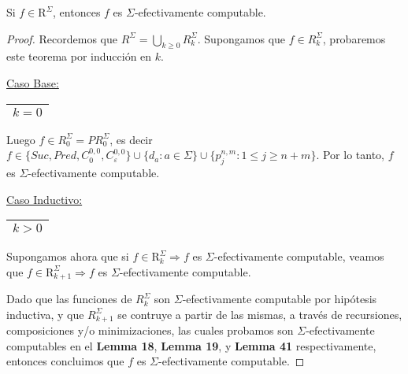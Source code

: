   \begin{theorem}
    \par Si $f \in \mathrm{R}^{\Sigma}$, entonces $f$ es $\Sigma$-efectivamente computable.
  \end{theorem}
  \begin{proof}
    \par Recordemos que $R^{\Sigma} = \bigcup\limits_{k \geq 0} R_{k}^{\Sigma}$. Supongamos que $f \in
    R_{k}^{\Sigma}$, probaremos este teorema por inducción en $k$.

    \vspace{3mm}
    \underline{Caso Base:} \begin{tabular}{|c|} \hline $k = 0$ \\\hline \end{tabular}

    \par Luego $f \in R_{0}^{\Sigma} = PR_{0}^{\Sigma}$, es decir $f \in \{Suc, Pred, C_{0}^{0,0},
    C_{\varepsilon}^{0,0}\} \cup \{d_{a}: a \in \Sigma\} \cup \{p_{j}^{n,m} : 1 \leq j \geq n+m\}$. Por lo tanto, $f$ es
    $\Sigma$-efectivamente computable.

    \vspace{3mm}
		\underline{Caso Inductivo:} \begin{tabular}{|c|} \hline $k > 0$ \\\hline \end{tabular}

    \par Supongamos ahora que si $f \in \mathrm{R}_{k}^{\Sigma} \Rightarrow f$ es $\Sigma$-efectivamente computable,
    veamos que $f \in \mathrm{R}_{k+1}^{\Sigma} \Rightarrow f$ es $\Sigma$-efectivamente computable.

    \par Dado que las funciones de $R_{k}^{\Sigma}$ son $\Sigma$-efectivamente computable por hipótesis inductiva, y que
    $R_{k+1}^{\Sigma}$ se contruye a partir de las mismas, a través de recursiones, composiciones y/o minimizaciones,
    las cuales probamos son $\Sigma$-efectivamente computables en el \textbf{Lemma 18}, \textbf{Lemma 19}, y
    \textbf{Lemma 41} respectivamente, entonces concluimos que $f$ es $\Sigma$-efectivamente computable.
  \end{proof}

